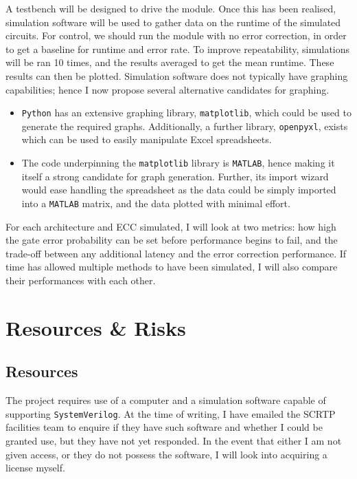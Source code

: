 \documentclass[12pt,a4paper]{article}
\begin{document}
\noindent A testbench will be designed to drive the module. Once this has been realised, simulation software will be 
used to gather data on the runtime of the simulated circuits. For control, we should run the module with no error 
correction, in order to get a baseline for runtime and error rate. To improve repeatability, simulations will be ran 
10 times, and the results averaged to get the mean runtime. These results can then be plotted. Simulation software 
does not typically have graphing capabilities; hence I now propose several alternative candidates for graphing.
\begin{itemize}
    \item \texttt{Python} has an extensive graphing library, \texttt{matplotlib}, which could be used to generate 
    the required graphs. \cite{ref3} Additionally, a further library, \texttt{openpyxl}, exists which can be used to 
    easily manipulate Excel spreadsheets. \cite{ref4}
    \item The code underpinning the \texttt{matplotlib} library is \texttt{MATLAB}, hence making it itself a strong 
    candidate for graph generation. Further, its import wizard would ease handling the spreadsheet as the data could 
    be simply imported into a \texttt{MATLAB} matrix, and the data plotted with minimal effort.
\end{itemize}

\noindent For each architecture and ECC simulated, I will look at two metrics: how high the gate error probability 
can be set before performance begins to fail, and the trade-off between any additional latency and the error 
correction performance. If time has allowed multiple methods to have been simulated, I will also compare their 
performances with each other.


\section{Resources \& Risks}
\subsection{Resources}
The project requires use of a computer and a simulation software capable of supporting \texttt{SystemVerilog}. At 
the time of writing, I have emailed the SCRTP facilities team to enquire if they have such software and whether I 
could be granted use, but they have not yet responded. In the event that either I am not given access, or they do 
not possess the software, I will look into acquiring a license myself.
\end{document}
